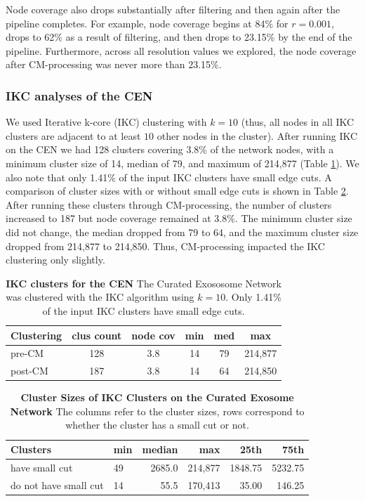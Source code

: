 \documentclass[11pt]{article}   	%
\begin{document}
Node coverage also drops substantially after filtering and then again after the pipeline completes.
For example,
node coverage begins at 84\% for $r=0.001$, drops to 62\% as a result of filtering, and then drops to 23.15\% by the end of the
pipeline.
Furthermore,
across all resolution values we explored, the node coverage after CM-processing was never more than 23.15\%.

\subsubsection{IKC analyses of the CEN}

We used Iterative k-core (IKC) clustering with $k=10$ (thus, all nodes in all  IKC clusters are adjacent to at least $10$ other nodes in the cluster).
After running IKC on the CEN we had 128 clusters covering 3.8\% of the network nodes, with a minimum cluster size of 14, median of 79, and maximum of 214,877 (Table \ref{tab:IKC-11-CEN-basicstats}).
We also note that  only 1.41\% of the input IKC clusters have small edge cuts.
A comparison of cluster sizes with or without small edge cuts is shown in  Table \ref{tab:IKC-CEN-sizes}.
 After running these clusters through CM-processing, the number of clusters increased to 187 but node coverage remained at 3.8\%.   The  minimum cluster size did not change, the median dropped from 79 to 64, and the maximum cluster size dropped from 214,877 to 214,850.
 Thus, CM-processing impacted the IKC clustering only slightly.

\begin{table}[ht]
\centering
\begin{tabular}{lccccc}
  \hline
Clustering & clus count & node cov & min & med & max       \\ \hline
pre-CM       & 128         & 3.8       & 14  & 79  & 214,877 \\
post-CM & 187 & 3.8 & 14 & 64 & 214,850\\
  \hline
\end{tabular}
\caption[IKC clusters pre- and post-CM processing for the CEN]{\textbf{IKC clusters  for the CEN}
The Curated Exososome Network was clustered with the IKC algorithm using  $k=10$.
Only 1.41\% of the input IKC clusters have small edge cuts.}
\label{tab:IKC-11-CEN-basicstats}
\end{table}

\begin{table}[ht]
\centering
\begin{tabular}{llrrrr}
    \hline
      Clusters        & min & median & max    & 25th    & 75th    \\
    \hline
have small cut    & 49  & 2685.0  & 214,877 & 1848.75 & 5232.75 \\
do not have small cut & 14  & 55.5   & 170,413 & 35.00      & 146.25 \\
    \hline
\end{tabular}
\caption[Cluster Sizes of IKC Clusters on the CEN ]{\textbf{ Cluster Sizes of IKC Clusters on the Curated Exosome Network}  The columns refer to the  cluster sizes, rows correspond to whether the cluster has a small cut or not.}
\label{tab:IKC-CEN-sizes}
\end{table}
\end{document}
